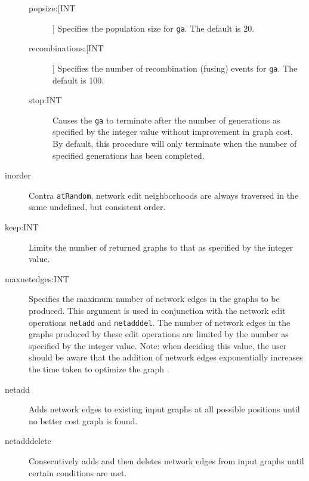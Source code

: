 \begin{description}
\begin{description}
			\item[popsize:[INT]] Specifies the population size for \texttt{ga}. The default is 
			20.
			
			\item[recombinations:[INT]] Specifies the number of recombination (fusing) events for 
			\texttt{ga}. The default is 100.
			
			
			\item[stop:INT] Causes the \texttt{ga} to terminate after the number of 
			generations as specified by the integer value without improvement in graph 
			cost.  By default, this procedure will only terminate when the number of specified 
			generations has been completed.
			
		\end{description}
		
		\item[inorder] Contra \texttt{atRandom}, network edit neighborhoods are always traversed 
		in the same undefined, but consistent order.

		\item[keep:INT] Limits the number of returned graphs to that as specified by the 
		integer value. 
		
		\item[maxnetedges:INT] Specifies the maximum number of network edges in the graphs 
		to be produced. This argument is used in conjunction with the network edit operations 
		\texttt{netadd} and \texttt{netadddel}. The number of network edges in the graphs produced 
		by these edit operations are limited by the number as specified by the integer value.
		Note: when deciding this value, the user should be aware that the addition of network 
		edges exponentially increases the time taken to optimize the graph 
		\cite{WheelerandWashburn2023}.
				
		\item[netadd] Adds network edges to existing input graphs at all possible positions 
		until no better cost graph is found.
		
		\item[netadddelete] Consecutively adds and then deletes network edges from 
		input graphs until certain conditions are met.
			

\end{description}

